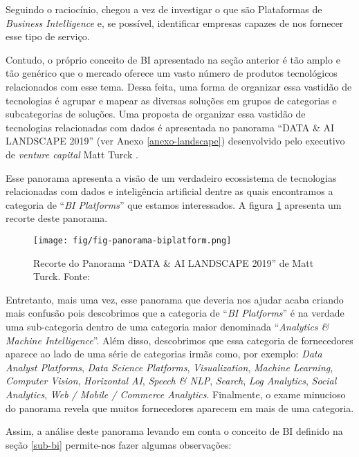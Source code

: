 Seguindo o raciocínio, chegou a vez de investigar o que são Plataformas de \emph{Business Intelligence} e, se possível, identificar empresas capazes de nos fornecer esse tipo de serviço.

Contudo, o próprio conceito de BI apresentado na seção anterior é tão amplo e tão genérico que o mercado oferece um vasto número de produtos tecnológicos relacionados com esse tema. Dessa feita, uma forma de organizar essa vastidão de tecnologias é agrupar e mapear as diversas soluções em grupos de categorias e subcategorias de soluções. Uma proposta de organizar essa vastidão de tecnologias relacionadas com dados é apresentada no panorama ``DATA \& AI LANDSCAPE 2019'' (ver Anexo \ref{anexo-landscape}) desenvolvido pelo executivo de \emph{venture capital} Matt Turck \cite{mattturck:principal}. 

Esse panorama apresenta a visão de um verdadeiro ecossistema de tecnologias relacionadas com dados e inteligência artificial dentre as quais encontramos a categoria de ``\emph{BI Platforms}'' que estamos interessados. A figura \ref{fig:landscape:bi} apresenta um recorte deste panorama. 

        \begin{figure}[htbp!]
            \centering
            \texttt{[image: fig/fig-panorama-biplatform.png]}
            \caption{Recorte do Panorama ``DATA \& AI LANDSCAPE 2019'' de Matt Turck. Fonte: \cite{mattturck:principal}}
            \label{fig:landscape:bi}
        \end{figure}

Entretanto, mais uma vez, esse panorama que deveria nos ajudar acaba criando mais confusão pois descobrimos que a categoria de ``\emph{BI Platforms}'' é na verdade uma sub-categoria dentro de uma categoria maior denominada ``\emph{Analytics \& Machine Intelligence}''. Além disso, descobrimos que essa categoria de fornecedores aparece ao lado de uma série de categorias irmãs como, por exemplo: 
\emph{Data Analyst Platforms}, 
\emph{Data Science Platforms}, 
\emph{Visualization}, 
\emph{Machine Learning}, 
\emph{Computer Vision},
\emph{Horizontal AI},
\emph{Speech \& NLP},
\emph{Search},
\emph{Log Analytics},
\emph{Social Analytics},
\emph{Web / Mobile / Commerce Analytics}. Finalmente, o exame minucioso do panorama revela que  muitos fornecedores aparecem em mais de uma categoria.

Assim, a análise deste panorama levando em conta o conceito de BI definido na seção \ref{sub-bi} permite-nos fazer algumas observações:

